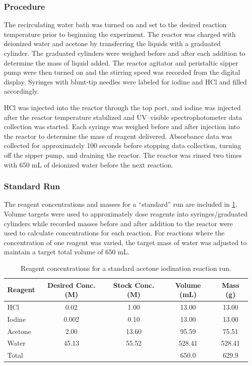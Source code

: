 \documentclass{article}
\begin{document}
\subsubsection{Procedure}
The recirculating water bath was turned on and set to the desired reaction temperature prior to beginning the experiment. The reactor was charged with deionized water and acetone by transferring the liquids with a graduated cylinder. The graduated cylinders were weighed before and after each addition to determine the mass of liquid added. The reactor agitator and peristaltic sipper pump were then turned on and the stirring speed was recorded from the digital display. Syringes with blunt-tip needles were labeled for iodine and HCl and filled accordingly. 

HCl was injected into the reactor through the top port, and iodine was injected after the reactor temperature stabilized and UV–visible spectrophotometer data collection was started. Each syringe was weighed before and after injection into the reactor to determine the mass of reagent delivered. Absorbance data was collected for approximately 100 seconds before stopping data collection, turning off the sipper pump, and draining the reactor. The reactor was rinsed two times with 650 mL of deionized water before the next reaction.


\subsubsection{Standard Run}
The reagent concentrations and masses for a ``standard'' run are included in \cref{tab:standardrun}. Volume targets were used to approximately dose reagents into syringes/graduated cylinders while recorded masses before and after addition to the reactor were used to calculate concentrations for each reaction. For reactions where the concentration of one reagent was varied, the target mass of water was adjusted to maintain a target total volume of 650 mL.

\begin{table}[H]
    \centering
    \caption{Reagent concentrations for a standard acetone iodination reaction run.}
    \label{tab:standardrun}
    \begin{tabular}{lcccc}
        \toprule
        Reagent & Desired Conc. (M) & Stock Conc. (M) & Volume (mL) & Mass (g) \\
        \midrule
        HCl      & 0.02  & 1.00  & 13.00    & 13.00     \\
        Iodine   & 0.002 & 0.10  & 13.00    & 13.00     \\
        Acetone  & 2.00     & 13.60 & 95.59 & 75.51  \\
        Water    & 45.13 & 55.52 & 528.41 & 528.41 \\
        \midrule
        Total & & & 650.0 & 629.9 \\
        \bottomrule
    \end{tabular}
\end{table}
\end{document}
